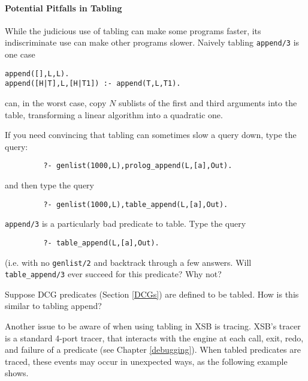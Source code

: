\paragraph*{Potential Pitfalls in Tabling}
While the judicious use of tabling can make some programs faster, its
indiscriminate use can make other programs slower.  Naively tabling
{\tt append/3} is one case
\begin{center}
\begin{minipage}{3.5in}
\begin{verbatim}
append([],L,L).
append([H|T],L,[H|T1]) :- append(T,L,T1).
\end{verbatim}						       
\end{minipage}
\end{center}
can, in the worst case, copy $N$ sublists of the first and third
arguments into the table, transforming a linear algorithm into a
quadratic one.

\begin{exercise} \label{ex:append}
If you need convincing that tabling can sometimes slow a query down,
type the query:
\begin{verbatim}
         ?- genlist(1000,L),prolog_append(L,[a],Out).
\end{verbatim}
and then type the query
\begin{verbatim}
         ?- genlist(1000,L),table_append(L,[a],Out).
\end{verbatim}
{\tt append/3} is a particularly bad predicate to table.  Type the query
\begin{verbatim}
         ?- table_append(L,[a],Out).
\end{verbatim}
(i.e. with no {\tt genlist/2} and backtrack through a few answers.
Will {\tt table\_append/3} ever succeed for this predicate?  Why not?

Suppose DCG predicates (Section \ref{DCGs}) are defined to be tabled.
How is this similar to tabling append?
\end{exercise}

Another issue to be aware of when using tabling in XSB is tracing.
XSB's tracer is a standard 4-port tracer, that interacts with the
engine at each call, exit, redo, and failure of a predicate (see
Chapter \ref{debugging}).  When tabled predicates are traced, these
events may occur in unexpected ways, as the following example shows.

